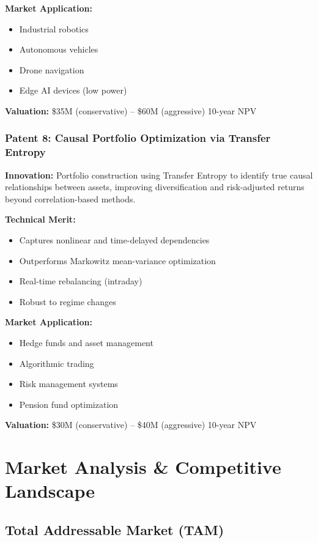 \documentclass[11pt,letterpaper]{article}
\begin{document}
\textbf{Market Application:}
\begin{itemize}
    \item Industrial robotics
    \item Autonomous vehicles
    \item Drone navigation
    \item Edge AI devices (low power)
\end{itemize}

\textbf{Valuation:} \$35M (conservative) -- \$60M (aggressive) 10-year NPV

\subsubsection{Patent 8: Causal Portfolio Optimization via Transfer Entropy}

\textbf{Innovation:} Portfolio construction using Transfer Entropy to identify true causal relationships between assets, improving diversification and risk-adjusted returns beyond correlation-based methods.

\textbf{Technical Merit:}
\begin{itemize}
    \item Captures nonlinear and time-delayed dependencies
    \item Outperforms Markowitz mean-variance optimization
    \item Real-time rebalancing (intraday)
    \item Robust to regime changes
\end{itemize}

\textbf{Market Application:}
\begin{itemize}
    \item Hedge funds and asset management
    \item Algorithmic trading
    \item Risk management systems
    \item Pension fund optimization
\end{itemize}

\textbf{Valuation:} \$30M (conservative) -- \$40M (aggressive) 10-year NPV

\newpage

\section{Market Analysis \& Competitive Landscape}

\subsection{Total Addressable Market (TAM)}
\end{document}
